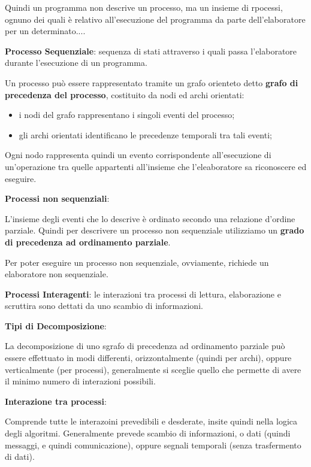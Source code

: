 \documentclass{article}
\begin{document}
Quindi un programma non descrive un processo, ma un insieme di rpocessi, ognuno dei quali è relativo all'esecuzione del programma da parte dell'elaboratore per un determinato....

\vspace{5mm}
\textbf{Processo Sequenziale}: sequenza di stati attraverso i quali passa l'elaboratore durante l'esecuzione di un programma.

\vspace{3mm}
Un processo può essere rappresentato tramite un grafo orienteto detto \textbf{grafo di precedenza del processo}, costituito da nodi ed archi orientati:
\begin{itemize}
    \item i nodi del grafo rappresentano i singoli eventi del processo;
    \item gli archi orientati identificano le precedenze temporali tra tali eventi;
\end{itemize}

Ogni nodo rappresenta quindi un evento corrispondente all'esecuzione di un'operazione tra quelle appartenti all'insieme che l'eleaboratore sa riconoscere ed eseguire.

\vspace{3mm}
\textbf{Processi non sequenziali}:

L'insieme degli eventi che lo descrive è ordinato secondo una relazione d'ordine parziale. Quindi per descrivere un processo non sequenziale utilizziamo
un \textbf{grado di precedenza ad ordinamento parziale}.

Per poter eseguire un processo non sequenziale, ovviamente, richiede un elaboratore non sequenziale.

\vspace{3mm}
\textbf{Processi Interagenti}: le interazioni tra processi di lettura, elaborazione e scruttira sono dettati da uno scambio di informazioni.

\vspace{5mm}
\textbf{Tipi di Decomposizione}:

La decomposizione di uno sgrafo di precedenza ad ordinamento parziale può essere effettuato in modi differenti, orizzontalmente (quindi per archi), oppure
verticalmente (per processi), generalmente si sceglie quello che permette di avere il minimo numero di interazioni possibili.

\vspace{5mm}
\textbf{Interazione tra processi}:

Comprende tutte le interazoini prevedibili e desderate, insite quindi nella logica degli algoritmi. Generalmente
prevede scambio di informazioni, o dati (quindi messaggi, e quindi comunicazione), oppure segnali temporali (senza trasfermento di dati).
\end{document}
